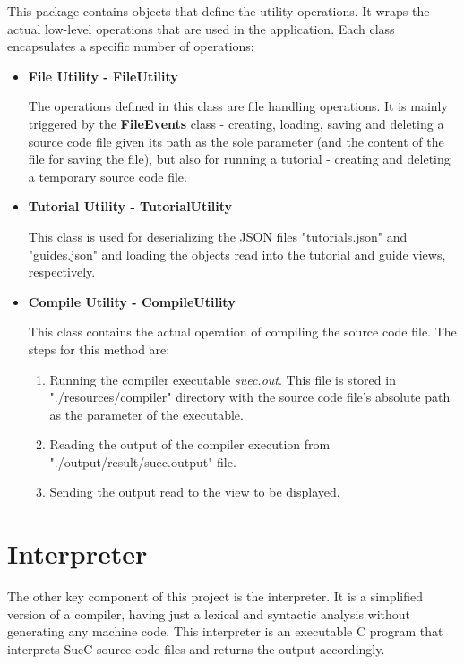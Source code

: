 \documentclass[12pt,a4paper,twoside]{report}
\begin{document}
\begin{enumerate}
This package contains objects that define the utility operations. It wraps the actual low-level operations that are used in the application. Each class encapsulates a specific number of operations:
\begin{itemize}
\item \textbf{File Utility - FileUtility}
	
	The operations defined in this class are file handling operations. It is mainly triggered by the \textbf{FileEvents} class - creating, loading, saving and deleting a source code file given its path as the sole parameter (and the content of the file for saving the file), but also for running a tutorial - creating and deleting a temporary source code file.
\item \textbf{Tutorial Utility - TutorialUtility}

	This class is used for deserializing the JSON files "tutorials.json" and "guides.json" and loading the objects read into the tutorial and guide views, respectively.

\item \textbf{Compile Utility - CompileUtility}
	
	This class contains the actual operation of compiling the source code file. The steps for this method are: 
	\begin{enumerate}
	\item Running the compiler executable \textit{suec.out}. This file is stored in "./resources/compiler" directory with the source code file's absolute path as the parameter of the executable.
	\item Reading the output of the compiler execution from "./output/result/suec.output" file.
	\item Sending the output read to the view to be displayed.
	\end{enumerate}
\end{itemize}
\end{enumerate}

\section{Interpreter}

The other key component of this project is the interpreter. It is a simplified version of a compiler, having just a lexical and syntactic analysis without generating any machine code. This interpreter is an executable C program that interprets SueC source code files and returns the output accordingly.
\end{document}
